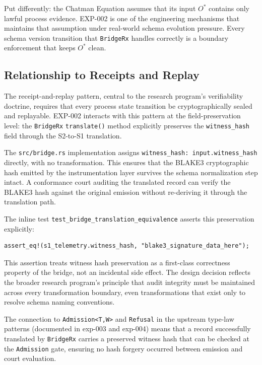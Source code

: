 Put differently: the Chatman Equation assumes that its input $O^*$ contains only
lawful process evidence. EXP-002 is one of the engineering mechanisms that maintains
that assumption under real-world schema evolution pressure. Every schema version
transition that \texttt{BridgeRx} handles correctly is a boundary enforcement that
keeps $O^*$ clean.

\subsection{Relationship to Receipts and Replay}
\label{sec:otel-weaver-exp-002-diff-to-residual-lineage-receipts}

The receipt-and-replay pattern, central to the research program's verifiability
doctrine, requires that every process state transition be cryptographically
sealed and replayable. EXP-002 interacts with this pattern at the field-preservation
level: the \texttt{BridgeRx} \texttt{translate()} method explicitly preserves the
\texttt{witness\_hash} field through the S2-to-S1 translation.

The \texttt{src/bridge.rs} implementation assigns
\texttt{witness\_hash: input.witness\_hash} directly, with no transformation. This
ensures that the BLAKE3 cryptographic hash emitted by the instrumentation layer
survives the schema normalization step intact. A conformance court auditing the
translated record can verify the BLAKE3 hash against the original emission without
re-deriving it through the translation path.

The inline test \texttt{test\_bridge\_translation\_equivalence} asserts this
preservation explicitly:
\begin{verbatim}
assert_eq!(s1_telemetry.witness_hash, "blake3_signature_data_here");
\end{verbatim}
This assertion treats witness hash preservation as a first-class correctness
property of the bridge, not an incidental side effect. The design decision reflects
the broader research program's principle that audit integrity must be maintained
across every transformation boundary, even transformations that exist only to
resolve schema naming conventions.

The connection to \texttt{Admission<T,W>} and \texttt{Refusal} in the upstream
type-law patterns (documented in exp-003 and exp-004) means that a record
successfully translated by \texttt{BridgeRx} carries a preserved witness hash that
can be checked at the \texttt{Admission} gate, ensuring no hash forgery occurred
between emission and court evaluation.
